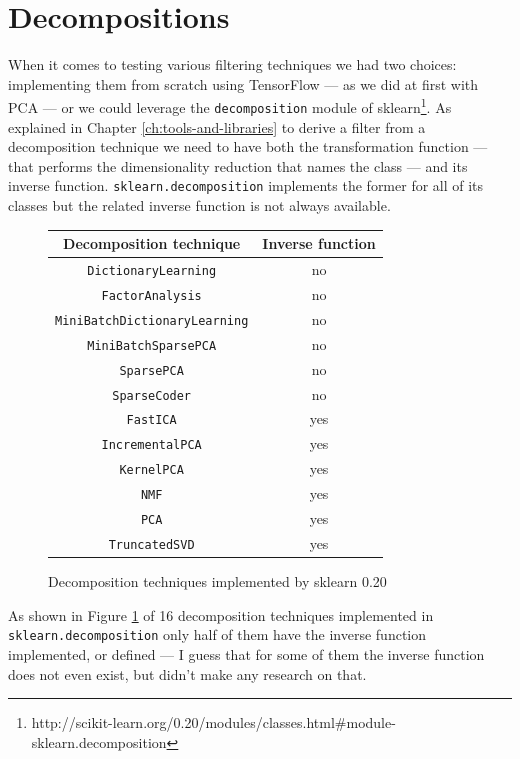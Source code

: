 \section{Decompositions}

When it comes to testing various filtering techniques we had two
choices: implementing them from scratch using TensorFlow --- as we did
at first with PCA --- or we could leverage the \texttt{decomposition}
module of
sklearn\footnote{http://scikit-learn.org/0.20/modules/classes.html\#module-sklearn.decomposition}.
As explained in Chapter \ref{ch:tools-and-libraries} to derive a filter
from a decomposition technique we need to have both the transformation
function --- that performs the dimensionality reduction that names the
class --- and its inverse function. \texttt{sklearn.decomposition}
implements the former for all of its classes but the related inverse
function is not always available.

\begin{figure}
  \centering
  \begin{tabular}{|c|c|}
    \hline
    Decomposition technique & Inverse function\\
    \hline
    \texttt{DictionaryLearning} & no \\
    \hline
    \texttt{FactorAnalysis} & no \\
    \hline
    \texttt{MiniBatchDictionaryLearning} & no \\
    \hline
    \texttt{MiniBatchSparsePCA} & no \\
    \hline
    \texttt{SparsePCA} & no \\
    \hline
    \texttt{SparseCoder} & no \\
    \hline
    \texttt{FastICA} & yes \\
    \hline
    \texttt{IncrementalPCA} & yes \\
    \hline
    \texttt{KernelPCA} & yes \\
    \hline
    \texttt{NMF} & yes \\
    \hline
    \texttt{PCA} & yes \\
    \hline
    \texttt{TruncatedSVD} & yes \\
    \hline
  \end{tabular}
  \caption{Decomposition techniques implemented by sklearn 0.20}
  \label{fig:decomposition-techniques}
\end{figure}

As shown in Figure \ref{fig:decomposition-techniques} of 16
decomposition techniques implemented in \texttt{sklearn.decomposition}
only half of them have the inverse function implemented, or defined
--- I guess that for some of them the inverse function does not even
exist, but didn't make any research on that.

